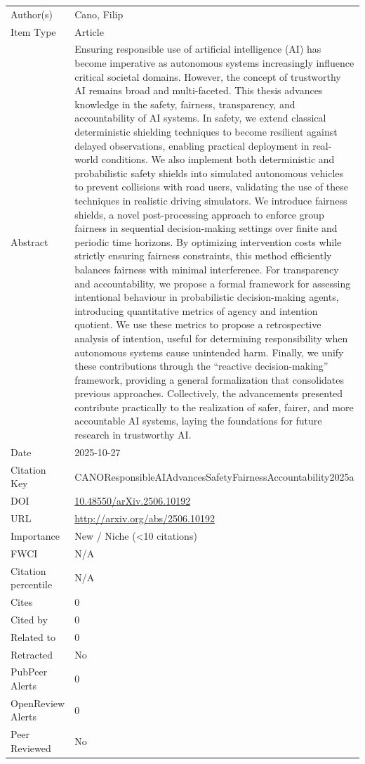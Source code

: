 \documentclass{article}
\begin{document}
\begin{enumerate}[label=\arabic*., font=\Large]
\begin{longtable}{p{} p{\contentcolwidth-2\tabcolsep}}
\toprule
Author(s) & Cano, Filip \\
Item Type & Article \\
Abstract & Ensuring responsible use of artificial intelligence (AI) has become imperative as autonomous systems increasingly influence critical societal domains. However, the concept of trustworthy AI remains broad and multi-faceted. This thesis advances knowledge in the safety, fairness, transparency, and accountability of AI systems. In safety, we extend classical deterministic shielding techniques to become resilient against delayed observations, enabling practical deployment in real-world conditions. We also implement both deterministic and probabilistic safety shields into simulated autonomous vehicles to prevent collisions with road users, validating the use of these techniques in realistic driving simulators. We introduce fairness shields, a novel post-processing approach to enforce group fairness in sequential decision-making settings over finite and periodic time horizons. By optimizing intervention costs while strictly ensuring fairness constraints, this method efficiently balances fairness with minimal interference. For transparency and accountability, we propose a formal framework for assessing intentional behaviour in probabilistic decision-making agents, introducing quantitative metrics of agency and intention quotient. We use these metrics to propose a retrospective analysis of intention, useful for determining responsibility when autonomous systems cause unintended harm. Finally, we unify these contributions through the ``reactive decision-making'' framework, providing a general formalization that consolidates previous approaches. Collectively, the advancements presented contribute practically to the realization of safer, fairer, and more accountable AI systems, laying the foundations for future research in trustworthy AI. \\
Date & 2025-10-27 \\
Citation Key & CANOResponsibleAIAdvancesSafetyFairnessAccountability2025a \\
DOI & \href{http://doi.org/10.48550/arXiv.2506.10192}{10.48550/arXiv.2506.10192} \\
URL & \url{http://arxiv.org/abs/2506.10192} \\
Importance & New / Niche (<10 citations) \\
FWCI & N/A \\
Citation percentile & N/A \\
Cites & 0 \\
Cited by & 0 \\
Related to & 0 \\
Retracted & No \\
PubPeer Alerts & 0 \\
OpenReview Alerts & 0 \\
Peer Reviewed & No \\
\bottomrule
\end{longtable}


\end{enumerate}
\end{document}
